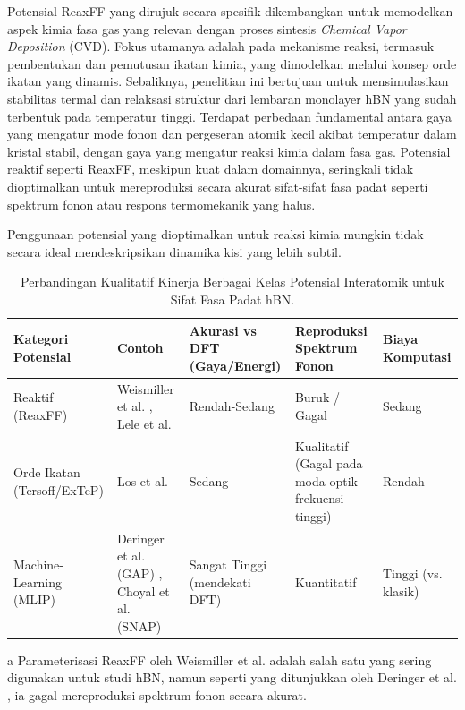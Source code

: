 Potensial ReaxFF yang dirujuk \citep{Lele2022} secara spesifik dikembangkan untuk memodelkan aspek kimia fasa gas yang relevan dengan proses sintesis \textit{Chemical Vapor Deposition} (CVD). Fokus utamanya adalah pada mekanisme reaksi, termasuk pembentukan dan pemutusan ikatan kimia, yang dimodelkan melalui konsep orde ikatan yang dinamis. Sebaliknya, penelitian ini bertujuan untuk mensimulasikan stabilitas termal dan relaksasi struktur dari lembaran monolayer hBN yang sudah terbentuk pada temperatur tinggi. Terdapat perbedaan fundamental antara gaya yang mengatur mode fonon dan pergeseran atomik kecil akibat temperatur dalam kristal stabil, dengan gaya yang mengatur reaksi kimia dalam fasa gas. Potensial reaktif seperti ReaxFF, meskipun kuat dalam domainnya, seringkali tidak dioptimalkan untuk mereproduksi secara akurat sifat-sifat fasa padat seperti spektrum fonon atau respons termomekanik yang halus.

Penggunaan potensial yang dioptimalkan untuk reaksi kimia mungkin tidak secara ideal mendeskripsikan dinamika kisi yang lebih subtil. 

\begin{table}[h!]
  \centering
  \caption{Perbandingan Kualitatif Kinerja Berbagai Kelas Potensial Interatomik untuk Sifat Fasa Padat hBN.}
  \label{tab:potensial_comparison}
  \begin{threeparttable}
    \begin{tabular}{p{} p{} p{} p{} p{}}
      \toprule
      \textbf{Kategori Potensial} & \textbf{Contoh} & \textbf{Akurasi vs DFT (Gaya/Energi)} & \textbf{Reproduksi Spektrum Fonon} & \textbf{Biaya Komputasi} \\
      \midrule
      Reaktif (ReaxFF) & Weismiller et al.\tnote{a} \citep{Weismiller2010}, Lele et al. \citep{Lele2022} & Rendah-Sedang & Buruk / Gagal \citep{Deringer2020} & Sedang \\
      \addlinespace
      Orde Ikatan (Tersoff/ExTeP) & Los et al. \citep{Los2017} & Sedang & Kualitatif (Gagal pada moda optik frekuensi tinggi) & Rendah \\
      \addlinespace
      Machine-Learning (MLIP) & Deringer et al. (GAP) \citep{Deringer2020}, Choyal et al. (SNAP) \citep{Choyal2024} & Sangat Tinggi (mendekati DFT) & Kuantitatif & Tinggi (vs. klasik) \\
      \bottomrule
    \end{tabular}
    \begin{tablenotes}[flushleft]
      \footnotesize
      \item[a] Parameterisasi ReaxFF oleh Weismiller et al. adalah salah satu yang sering digunakan untuk studi hBN, namun seperti yang ditunjukkan oleh Deringer et al. \citep{Deringer2020}, ia gagal mereproduksi spektrum fonon secara akurat.
    \end{tablenotes}
  \end{threeparttable}
\end{table}

